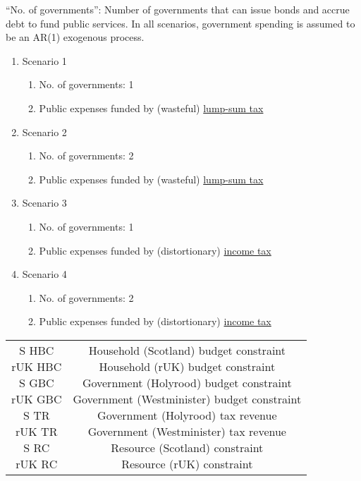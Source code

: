 \pagebreak
``No. of governments'': Number of governments that can issue bonds and accrue debt to fund public services. In all scenarios, government spending is assumed to be an AR(1) exogenous process.
\begin{enumerate}
    \item Scenario 1
    \begin{enumerate}
        \item No. of governments: 1
        \item Public expenses funded by (wasteful) \underline{lump-sum tax}
    \end{enumerate}
    \item Scenario 2
    \begin{enumerate}
        \item No. of governments: 2
        \item Public expenses funded by (wasteful) \underline{lump-sum tax}
    \end{enumerate}
    \item Scenario 3
    \begin{enumerate}
        \item No. of governments: 1
        \item Public expenses funded by (distortionary) \underline{income tax}
    \end{enumerate}
    \item Scenario 4
    \begin{enumerate}
        \item No. of governments: 2
        \item Public expenses funded by (distortionary) \underline{income tax}
    \end{enumerate}
\end{enumerate}
\pagebreak
\begin{table}[H]
    \centering
    \begin{tabular}{c|c}
        \makecell{
            S HBC \\
            rUK HBC \\
            S GBC \\
            rUK GBC \\
            S TR \\
            rUK TR \\
            S RC \\
            rUK RC \\
        } & 
        \makecell{
            Household (Scotland) budget constraint \\
            Household (rUK) budget constraint \\
            Government (Holyrood) budget constraint \\
            Government (Westminister) budget constraint \\
            Government (Holyrood) tax revenue \\
            Government (Westminister) tax revenue \\
            Resource (Scotland) constraint \\
            Resource (rUK) constraint \\
        }
    \end{tabular}
\end{table}
